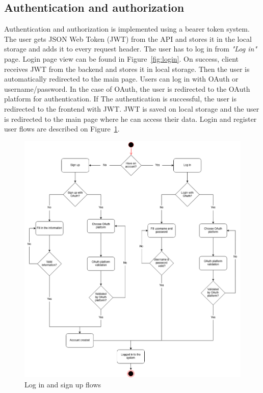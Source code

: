 \subsection{Authentication and authorization}\label{subsec:authentication-and-authorization}
Authentication and authorization is implemented using a bearer token system.
The user gets JSON Web Token (JWT) from the API and stores it in the local storage and adds it to every request header.
The user has to log in from \textit{"Log in"} page.
Login page view can be found in Figure~\ref{fig:login}.
On success, client receives JWT from the backend and stores it in local storage.
Then the user is automatically redirected to the main page.
Users can log in with OAuth or username/password.
In the case of OAuth, the user is redirected to the OAuth platform for authentication.
If The authentication is successful, the user is redirected to the frontend with JWT.
JWT is saved on local storage and the user is redirected to the main page where he can access their data.
Login and register user flows are described on Figure~\ref{fig:login-signup-diagram}.

\begin{figure}[H]
    \includegraphics[width=\textwidth]{figures/login_signup_user_flow}
    \caption{Log in and sign up flows}
    \label{fig:login-signup-diagram}
\end{figure}

